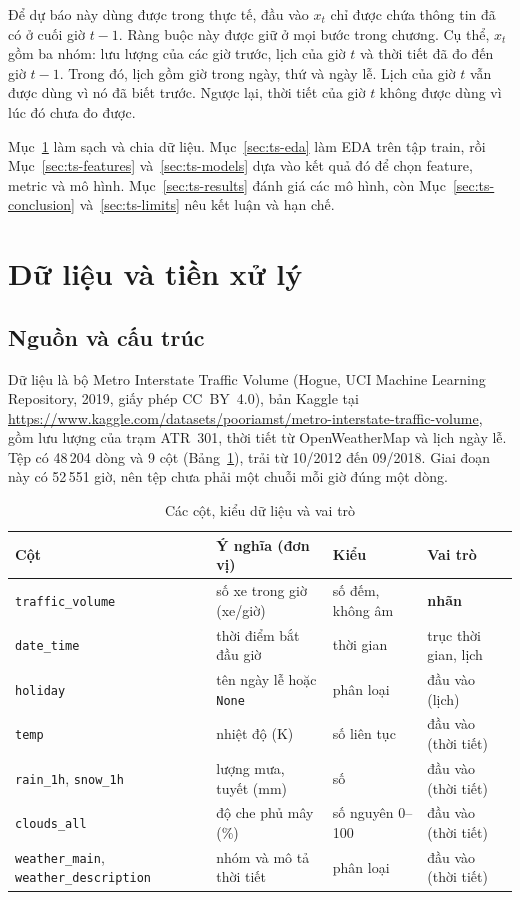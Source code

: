 Để dự báo này dùng được trong thực tế, đầu vào $x_t$ chỉ được chứa thông tin đã có ở cuối giờ $t-1$. Ràng buộc này được giữ ở mọi bước
trong chương. Cụ thể, $x_t$ gồm ba nhóm: lưu lượng của các giờ trước, lịch của giờ $t$ và thời tiết đã đo đến giờ $t-1$. Trong đó, lịch
gồm giờ trong ngày, thứ và ngày lễ. Lịch của giờ $t$ vẫn được dùng vì nó đã biết trước. Ngược lại, thời tiết của giờ $t$ không được dùng vì
lúc đó chưa đo được.

Mục~\ref{sec:ts-data} làm sạch và chia dữ liệu. Mục~\ref{sec:ts-eda} làm EDA trên tập train, rồi
Mục~\ref{sec:ts-features} và~\ref{sec:ts-models} dựa vào kết quả đó để chọn feature, metric và mô hình. Mục~\ref{sec:ts-results} đánh
giá các mô hình, còn Mục~\ref{sec:ts-conclusion} và~\ref{sec:ts-limits} nêu kết luận và hạn chế.

\section{Dữ liệu và tiền xử lý}
\label{sec:ts-data}
\label{sec:ts-prep}

\subsection{Nguồn và cấu trúc}
\label{sec:ts-source}
Dữ liệu là bộ Metro Interstate Traffic Volume (Hogue, UCI Machine Learning Repository, 2019, giấy phép CC~BY~4.0), bản Kaggle tại
\url{https://www.kaggle.com/datasets/pooriamst/metro-interstate-traffic-volume}, gồm lưu lượng của trạm ATR~301, thời tiết từ
OpenWeatherMap và lịch ngày lễ. Tệp có 48\,204 dòng và 9 cột (Bảng~\ref{tab:ts-columns}), trải từ 10/2012 đến 09/2018. Giai đoạn này có
52\,551 giờ, nên tệp chưa phải một chuỗi mỗi giờ đúng một dòng.

\begin{table}[H]
\centering
\caption{Các cột, kiểu dữ liệu và vai trò}
\label{tab:ts-columns}
\small
\begin{tabular}{>{\raggedright\arraybackslash}p{4.4cm}>{\raggedright\arraybackslash}p{3.6cm}>{\raggedright\arraybackslash}p{3.4cm}>{\raggedright\arraybackslash}p{2.8cm}}
\toprule
Cột & Ý nghĩa (đơn vị) & Kiểu & Vai trò\\
\midrule
\texttt{traffic\_volume} & số xe trong giờ (xe/giờ) & số đếm, không âm & \textbf{nhãn}\\
\texttt{date\_time} & thời điểm bắt đầu giờ & thời gian & trục thời gian, lịch\\
\texttt{holiday} & tên ngày lễ hoặc \texttt{None} & phân loại & đầu vào (lịch)\\
\texttt{temp} & nhiệt độ (K) & số liên tục & đầu vào (thời tiết)\\
\texttt{rain\_1h}, \texttt{snow\_1h} & lượng mưa, tuyết (mm) & số & đầu vào (thời tiết)\\
\texttt{clouds\_all} & độ che phủ mây (\%) & số nguyên 0--100 & đầu vào (thời tiết)\\
\texttt{weather\_main}, \texttt{weather\_description} & nhóm và mô tả thời tiết & phân loại & đầu vào (thời tiết)\\
\bottomrule
\end{tabular}
\end{table}

